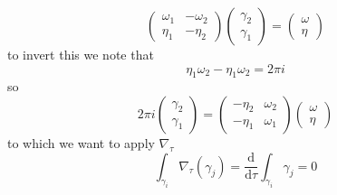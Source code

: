 \begin{frame}
    $$
    \left(\begin{array}{cc}
            \omega_{1} & -\omega_{2} \\
            \eta_{1} & -\eta_{2}
            \end{array}\right)\left(\begin{array}{l}
            \gamma_{2} \\
            \gamma_{1}
            \end{array}\right)=\left(\begin{array}{l}
            \omega \\
            \eta
    \end{array}\right)
    $$
    to invert this we note that
    $$
    \eta_{1} \omega_{2}-\eta_{1} \omega_{2}=2 \pi i
    $$
    so
    $$
    2 \pi i\left(\begin{array}{l}
            \gamma_{2} \\
            \gamma_{1}
            \end{array}\right)=\left(\begin{array}{ll}
            -\eta_{2} & \omega_{2} \\
            -\eta_{1} & \omega_{1}
            \end{array}\right)\left(\begin{array}{l}
            \omega \\
            \eta
    \end{array}\right)
    $$
    to which we want to apply $\nabla_\tau$
    $$
    \int_{{\gamma}_{{i}}} \nabla_{{\tau}}(\gamma_j)=\frac{\mathrm{d}}{\mathrm{d} \tau} \int_{\gamma_{{i}}}\gamma_j = 0
    $$
\end{frame}

